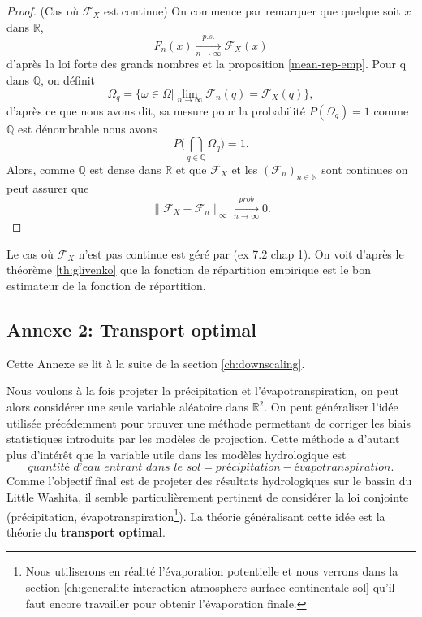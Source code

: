 \documentclass[a4paper,11pt]{article}
\numberwithin{equation}{section}
\begin{document}
\begin{proof} (Cas où $\mathcal{F}_X$ est continue)
	On commence par remarquer que quelque soit $x$ dans $\mathbb{R}$, \[F_{n}(x)\xrightarrow[n\to \infty]{p.s.}\mathcal{F}_X(x)\] d'après la loi forte des grands nombres et la proposition \eqref{mean-rep-emp}. Pour q dans $\mathbb{Q}$, on définit 
	\[\Omega_{q}=\{\omega \in \Omega | \lim_{n \to \infty} \mathcal{F}_{n}(q)=\mathcal{F}_X(q)\},\]
	d'après ce que nous avons dit, sa mesure pour la probabilité $P(\Omega_q)=1$ comme $\mathbb{Q}$ est dénombrable nous avons  
	\[P\Big(\bigcap_{q \in \mathbb{Q}} \Omega_q \Big)=1.\]
	Alors, comme $\mathbb{Q}$ est dense dans $\mathbb{R}$ et que $\mathcal{F}_{X}$ et les $(\mathcal{F}_n)_{n \in \mathbb{N}}$ sont continues on peut assurer que   
	\[	\|\mathcal{F}_{X}-\mathcal{F}_{n}\|_{\infty} \xrightarrow[n\to \infty]{prob} 0. \]
\end{proof}
Le cas où $\mathcal{F}_{X}$ n'est pas continue est géré par \cite{durrett2019probability} (ex 7.2 chap 1). On voit d'après le théorème \ref{th:glivenko} que la fonction de répartition empirique est le bon estimateur de la fonction de répartition. 

\subsection{Annexe 2: Transport optimal}
\label{annexe:transport-optimal}
Cette Annexe se lit à la suite de la section \ref{ch:downscaling}.

\vspace{0.7cm}

Nous voulons à la fois projeter la précipitation et l'évapotranspiration, on peut alors considérer une seule variable aléatoire dans $\mathbb{R}^2$. On peut généraliser l'idée utilisée précédemment pour trouver une méthode permettant de corriger les biais statistiques introduits par les modèles de projection. Cette méthode a d'autant plus d'intérêt que la variable utile dans les modèles hydrologique est 
\begin{equation}
	\label{eq-Qin-pr-etp}
	\textit{quantité d'eau entrant dans le sol}=\textit{précipitation}-\textit{évapotranspiration}.
\end{equation}
Comme l'objectif final est de projeter des résultats hydrologiques sur le bassin du Little Washita, il semble particulièrement pertinent de considérer la loi conjointe (précipitation, évapotranspiration\footnote{Nous utiliserons en réalité l'évaporation potentielle et nous verrons dans la section \ref{ch:generalite interaction atmosphere-surface continentale-sol} qu'il faut encore travailler pour obtenir l'évaporation finale.}). La théorie généralisant cette idée est la théorie du \textbf{transport optimal}.
\end{document}
